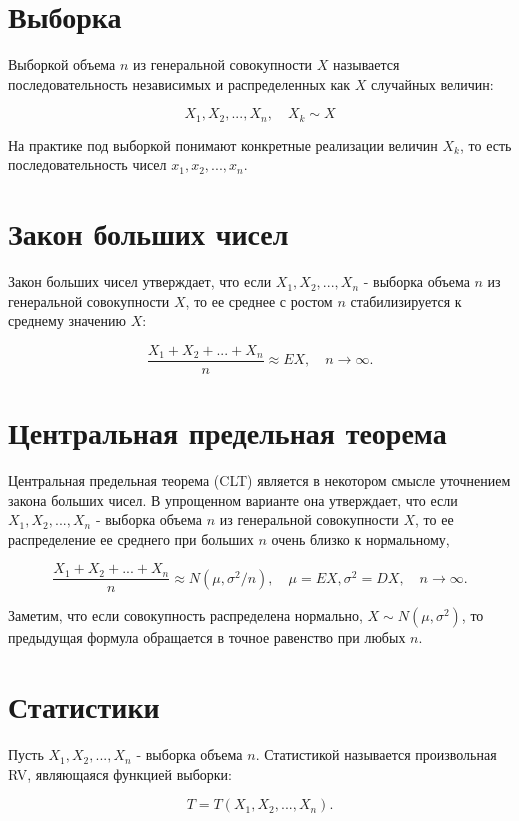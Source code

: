 \section{Выборка}

Выборкой объема $n$ из генеральной совокупности $X$ называется последовательность независимых и распределенных как $X$ случайных величин: 

$$
X_1, X_2, ..., X_n, \quad X_k \sim X
$$

На практике под выборкой понимают конкретные реализации величин $X_k$, то есть последовательность чисел $x_1, x_2, ..., x_n$.


\section{Закон больших чисел}

Закон больших чисел утверждает, что если $X_1, X_2, ..., X_n$ - выборка объема $n$ из генеральной совокупности $X$, то ее среднее с ростом $n$ стабилизируется к среднему значению $X$:

$$
\frac{X_1+X_2+...+X_n}{n} \approx EX, \quad n\rightarrow\infty.
$$ 


\section{Центральная предельная теорема}

Центральная предельная теорема (CLT) является в некотором смысле уточнением закона больших чисел.
В упрощенном варианте она утверждает, что если $X_1, X_2, ..., X_n$ - выборка объема $n$ из генеральной совокупности $X$, то ее распределение ее среднего при больших $n$ очень близко к нормальному,  

$$
\frac{X_1+X_2+...+X_n}{n} \approx N(\mu, \sigma^2/n), \quad \mu=EX, \sigma^2=DX, \quad n\rightarrow\infty.
$$

Заметим, что если совокупность распределена нормально, $X \sim N(\mu, \sigma^2)$, то предыдущая формула обращается в 
точное равенство при любых $n$.


\section{Статистики}

Пусть $X_1, X_2, ..., X_n$ - выборка объема $n$. Статистикой называется произвольная RV, являющаяся функцией выборки:

$$
T = T(X_1, X_2, ..., X_n).
$$

